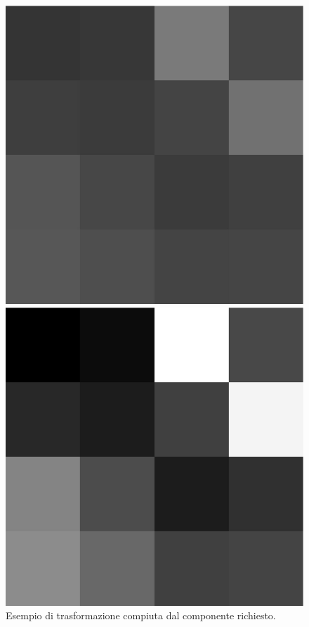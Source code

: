 \documentclass{article}
\begin{document}
\begin{figure}[h]
    \centering
    \begin{minipage}[c]{.3\linewidth}
        \centering
        \includegraphics[scale=0.21]{./images/preEqualizzazione.jpg}
    \end{minipage}\hspace{20pt}
    \begin{minipage}[c]{.3\linewidth}
        \centering
        \includegraphics[scale=0.21]{./images/postEqualizzazione.jpg}
    \end{minipage}
    \caption{Esempio di trasformazione compiuta dal componente richiesto.}
    \label{fig:esempioFIG}
\end{figure}
\end{document}
